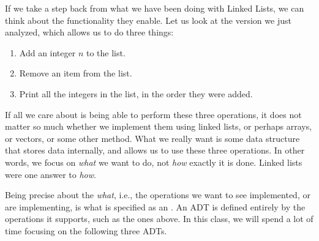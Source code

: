 If we take a step back from what we have been doing with Linked Lists,
we can think about the functionality they enable.
Let us look at the version we just analyzed,
which allows us to do three things:
\begin{enumerate}
\item Add an integer $n$ to the list.
\item Remove an item from the list.
\item Print all the integers in the list, in the order they were added.
\end{enumerate}

If all we care about is being able to perform these three operations,
it does not matter so much whether we implement them using linked
lists, or perhaps arrays, or vectors, or some other method. 
What we really want is some data structure that stores data
internally, and allows us to use these three operations. 
In other words, we focus on \emph{what} we want to do,
not \emph{how} exactly it is done.
Linked lists were one answer to \emph{how}.

Being precise about the \emph{what},
i.e., the operations we want to see implemented, or are implementing,
is what is specified as an . 
An ADT is defined entirely by the operations it supports,
such as the ones above.
In this class, we will spend a lot of time focusing on the following three ADTs.

